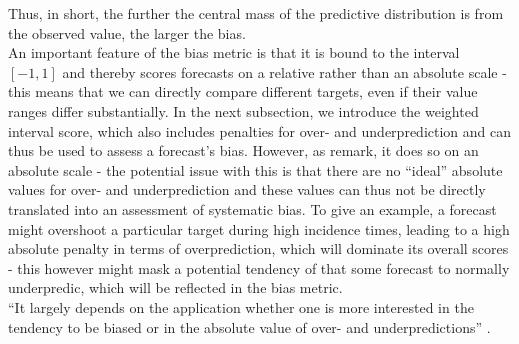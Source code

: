 Thus, in short, the further the central mass of the predictive distribution is from the observed value, the larger the bias.\\
An important feature of the bias metric is that it is bound to the interval $[-1,1]$ and thereby scores forecasts on a relative rather than an absolute scale - this means that we can directly compare different targets, even if their value ranges differ substantially.
In the next subsection, we introduce the weighted interval score, which also includes penalties for over- and underprediction and can thus be used to assess a forecast's bias. However, as \citep{bosse_evaluating_2022} remark, it does so on an absolute scale - the potential issue with this is that there are no ``ideal'' absolute values for over- and underprediction and these values can thus not be directly translated into an assessment of systematic bias. To give an example, a forecast might overshoot a particular target during high incidence times, leading to a high absolute penalty in terms of overprediction, which will dominate its overall scores - this however might mask a potential tendency of that some forecast to normally underpredic, which will be reflected in the bias metric.\\
``It largely depends on the application whether one is more interested in the tendency to be biased or in the absolute value of over- and underpredictions'' \citep{bosse_evaluating_2022}.
